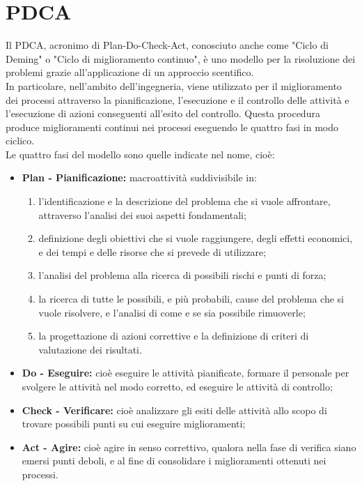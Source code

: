 
\section{PDCA}
Il PDCA, acronimo di Plan-Do-Check-Act, conosciuto anche come "Ciclo di Deming" o "Ciclo di miglioramento continuo", è uno modello per la risoluzione dei problemi grazie all'applicazione di un approccio scentifico.\\
In particolare, nell'ambito dell'ingegneria, viene utilizzato per il miglioramento dei processi attraverso la pianificazione, l'esecuzione e il controllo delle attività e l'esecuzione di azioni conseguenti all'esito del controllo. Questa procedura produce miglioramenti continui nei processi eseguendo le quattro fasi in modo ciclico.\\
Le quattro fasi del modello sono quelle indicate nel nome, cioè:
\begin{itemize}
\item \textbf{Plan - Pianificazione:} macroattività suddivisibile in:
	\begin{enumerate}
	\item l'identificazione e la descrizione del problema che si vuole affrontare, attraverso l'analisi dei suoi aspetti fondamentali;
	\item definizione degli obiettivi che si vuole raggiungere, degli effetti economici, e dei tempi e delle risorse che si prevede di utilizzare;
	\item l'analisi del problema alla ricerca di possibili rischi e punti di forza;
	\item la ricerca di tutte le possibili, e più probabili, cause del problema che si vuole risolvere, e l'analisi di come e se sia possibile rimuoverle;
	\item la progettazione di azioni correttive e la definizione di criteri di valutazione dei risultati.
	\end{enumerate}
\item \textbf{Do - Eseguire:} cioè eseguire le attività pianificate, formare il personale per svolgere le attività nel modo corretto, ed eseguire le attività di controllo;
\item \textbf{Check - Verificare:} cioè analizzare gli esiti delle attività allo scopo di trovare possibili punti su cui eseguire miglioramenti;
\item \textbf{Act - Agire:} cioè agire in senso correttivo, qualora nella fase di verifica siano emersi punti deboli, e al fine di consolidare i miglioramenti ottenuti nei processi.
\end{itemize}
